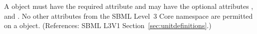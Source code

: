 A \UnitDefinition object must have the required attribute  and
may have the optional attributes ,  and
.  No other attributes from the SBML Level~3 Core namespace are
permitted on a \UnitDefinition object.  (References: SBML L3V1
Section~\ref{sec:unitdefinitions}.)
